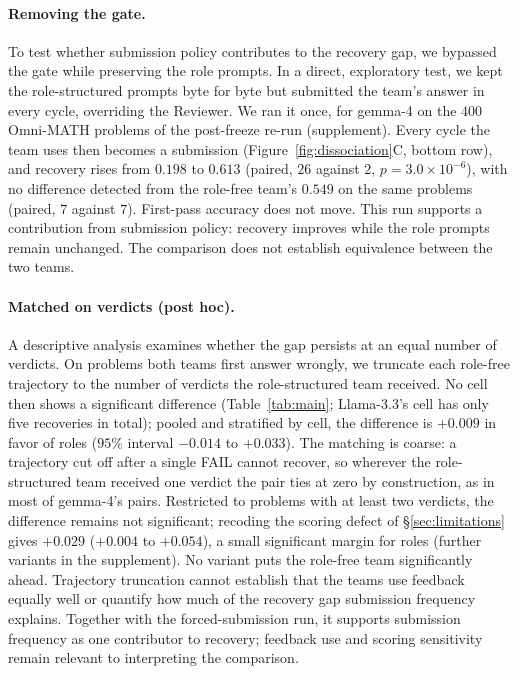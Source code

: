\paragraph{Removing the gate.} To test whether submission policy contributes
to the recovery gap, we bypassed the gate while preserving the role prompts.
In a direct, exploratory test, we kept the role-structured prompts byte for byte but
submitted the team's answer in every cycle, overriding the Reviewer. We ran
it once, for gemma-4 on the $400$ Omni-MATH problems of the post-freeze
re-run (supplement). Every cycle the team uses then becomes a submission
(Figure~\ref{fig:dissociation}C, bottom row), and recovery rises from
$0.198$ to $0.613$ (paired, $26$ against $2$, $p=3.0\times10^{-6}$),
with no difference detected from the role-free team's $0.549$ on the same
problems (paired, $7$ against $7$). First-pass accuracy does not move.
This run supports a contribution from submission policy: recovery improves
while the role prompts remain unchanged. The comparison does not establish
equivalence between the two teams.

\paragraph{Matched on verdicts (post hoc).} A descriptive analysis examines
whether the gap persists at an equal number of verdicts. On problems both
teams first answer wrongly, we truncate each role-free trajectory to the
number of verdicts the role-structured team received. No cell then shows a
significant difference (Table~\ref{tab:main}; Llama-3.3's cell has only
five recoveries in total); pooled and stratified by cell, the difference is $+0.009$ in favor
of roles ($95\%$ interval $-0.014$ to $+0.033$). The matching is coarse: a
trajectory cut off after a single FAIL cannot recover, so wherever the
role-structured team received one verdict the pair ties at zero by
construction, as in most of gemma-4's pairs. Restricted to problems with at
least two verdicts, the difference remains not significant; recoding the
scoring defect of \S\ref{sec:limitations} gives $+0.029$ ($+0.004$ to
$+0.054$), a small significant margin for roles (further variants in the
supplement). No variant puts the role-free team significantly ahead. Trajectory truncation cannot establish that the teams use feedback equally
well or quantify how much of the recovery gap submission frequency explains.
Together with the forced-submission run, it supports submission frequency
as one contributor to recovery; feedback use and scoring sensitivity remain
relevant to interpreting the comparison.

